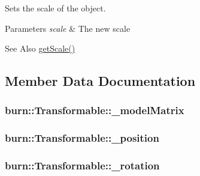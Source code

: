 Sets the scale of the object. 


\begin{DoxyParams}{Parameters}
{\em scale} & The new scale\\
\hline
\end{DoxyParams}
\begin{DoxySeeAlso}{See Also}
\hyperlink{classburn_1_1_transformable_a62d533b4a7d03b3b2aa9c783cb7cb061}{get\-Scale()} 
\end{DoxySeeAlso}


\subsection{Member Data Documentation}
\hypertarget{classburn_1_1_transformable_a6a06bcec86a7f2e70eba6fe7e8bbe61c}{
\subsubsection[{\-\_\-model\-Matrix}]{ burn\-::\-Transformable\-::\-\_\-model\-Matrix\hspace{0.3cm}{\ttfamily [protected]}}}\label{classburn_1_1_transformable_a6a06bcec86a7f2e70eba6fe7e8bbe61c}
\hypertarget{classburn_1_1_transformable_a1cb1a52f8518c7c2f50e45d8cd902767}{
\subsubsection[{\-\_\-position}]{ burn\-::\-Transformable\-::\-\_\-position\hspace{0.3cm}{\ttfamily [protected]}}}\label{classburn_1_1_transformable_a1cb1a52f8518c7c2f50e45d8cd902767}
\hypertarget{classburn_1_1_transformable_ad62e417f44d78cbeedfd30e62c1b896d}{
\subsubsection[{\-\_\-rotation}]{ burn\-::\-Transformable\-::\-\_\-rotation\hspace{0.3cm}{\ttfamily [protected]}}}\label{classburn_1_1_transformable_ad62e417f44d78cbeedfd30e62c1b896d}
